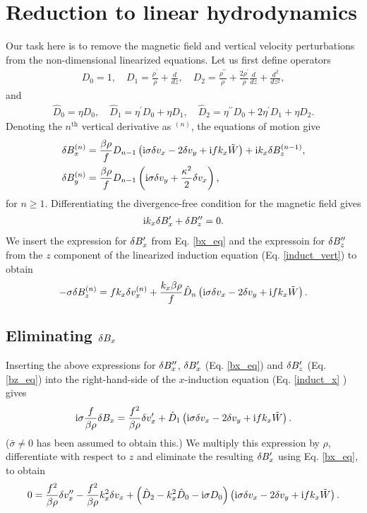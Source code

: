 \section{Reduction to linear hydrodynamics}\label{reduction} 
Our task here is to remove the magnetic field and vertical velocity
perturbations from the non-dimensional linearized equations. 
Let us first define operators
\begin{align}
  D_0 = 1, \quad D_1 = \frac{\rho^\prime}{\rho} + \frac{d}{dz}, \quad
  D_2 = \frac{\rho^{\prime\prime}}{\rho} +
  \frac{2\rho^\prime}{\rho}\frac{d}{dz} + \frac{d^2}{d z^2},
\end{align}
and 
\begin{align}
  \hat{D}_0 = \eta D_0, \quad \hat{D}_1 = \eta^\prime D_0 + \eta
  D_1,\quad \hat{D}_2 = \eta^{\prime\prime} D_0 + 2\eta^\prime D_1 +
  \eta D_2. 
\end{align}
Denoting the $n^\mathrm{th}$ vertical derivative as $^{(n)}$, the
equations of motion give
\begin{align}
  &\delta B_x^{(n)} = \frac{\beta\rho}{f}D_{n-1}\left(\mathrm{i}\sigma\delta v_x - 2\delta v_y +
  \mathrm{i} f k_x\tilde{W}\right) + \mathrm{i} k_x \delta B_z^{(n-1)},\label{bx_eq}\\
  &\delta B_y^{(n)} = \frac{\beta\rho}{f}D_{n-1}\left(\mathrm{i}\sigma\delta v_y +
  \frac{\kappa^2}{2}\delta v_x\right),\label{by_eq}
\end{align}
for $n\geq1$. Differentiating the divergence-free condition for the magnetic
field gives
\begin{align}
  \mathrm{i} k_x \delta B_x^{\prime} + \delta B_z^{\prime\prime} = 0.   
\end{align}
We insert the expression for $\delta B_x^\prime$ from Eq. \ref{bx_eq} and the
expressoin for $\delta B_z^{\prime\prime}$ from the $z$ component of the
linearized induction equation (Eq. \ref{induct_vert}) to obtain
\begin{align}\label{bz_eq}
  -\sigma\delta B_z^{(n)} = f k_x \delta v_x^{(n)} + \frac{k_x\beta\rho}{f}\hat{D}_n\left(\mathrm{i}\sigma\delta v_x - 2\delta v_y +
  \mathrm{i} f k_x\tilde{W} \right). 
\end{align}

\subsection{Eliminating $\delta B_x$}
Inserting the above expressions for $\delta B_x^{\prime\prime}$,
$\delta B_x^\prime$ (Eq. \ref{bx_eq}) and $\delta B_z^\prime$  (Eq. \ref{bz_eq})
into the right-hand-side of the $x$-induction equation (Eq. \ref{induct_x} ) gives   
\begin{align}
  \mathrm{i}\sigma \frac{f}{\beta\rho}\delta B_x =
  \frac{f^2}{\beta\rho}\delta v_x^\prime + \hat{D}_1\left(\mathrm{i}\sigma\delta v_x -
  2\delta v_y + \mathrm{i} f k_x\tilde{W}\right). \label{bx_expression}
\end{align}
($\bar{\sigma}\neq0$ has been assumed to obtain this.) 
We multiply this expression by $\rho$, differentiate with respect to
$z$ and eliminate the resulting $\delta B_x^\prime$ using
Eq. \ref{bx_eq}, to obtain
\begin{align}
  0 = \frac{f^2}{\beta\rho}\delta v_x^{\prime\prime} -
  \frac{f^2}{\beta\rho}k_x^2\delta v_x + \left(\hat{D}_2 - k_x^2 \hat{D}_0
    - \mathrm{i}\sigma D_0\right)\left( \mathrm{i}\sigma\delta v_x -
  2\delta v_y + \mathrm{i} f k_x\tilde{W}\right). \label{final_vx} 
\end{align}

